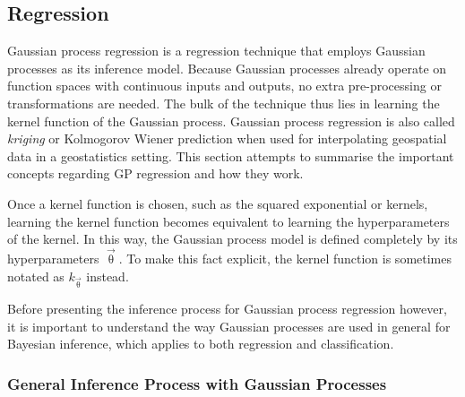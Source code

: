 		\subsection{Regression}
		\label{Background:GaussianProcesses:Regression}
		
			Gaussian process regression is a regression technique that employs Gaussian processes as its inference model. Because Gaussian processes already operate on function spaces with continuous inputs and outputs, no extra pre-processing or transformations are needed. The bulk of the technique thus lies in learning the kernel function of the Gaussian process. Gaussian process regression is also called \textit{kriging} or Kolmogorov Wiener prediction when used for interpolating geospatial data in a geostatistics setting. This section attempts to summarise the important concepts regarding GP regression and how they work.
			
			Once a kernel function is chosen, such as the squared exponential or \matern kernels, learning the kernel function becomes equivalent to learning the hyperparameters of the kernel. In this way, the Gaussian process model is defined completely by its hyperparameters $\vec{\uptheta}$. To make this fact explicit, the kernel function is sometimes notated as $k_{\vec{\uptheta}}$ instead. %
			
			Before presenting the inference process for Gaussian process regression however, it is important to understand the way Gaussian processes are used in general for Bayesian inference, which applies to both regression and classification.
			
			\subsubsection{General Inference Process with Gaussian Processes}
			\label{Background:GaussianProcesses:Regression:GeneralGaussianProcessInferece}
			
